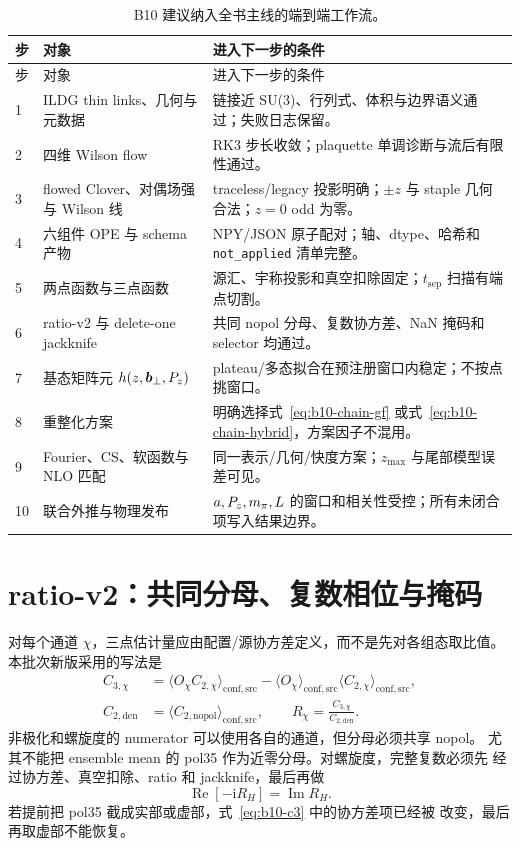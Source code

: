 \begin{longtable}{@{}p{}p{}p{}@{}}
\caption{B10 建议纳入全书主线的端到端工作流。}\label{tab:b10-workflow}\\
\toprule
步 & 对象 & 进入下一步的条件 \\
\midrule
\endfirsthead
\toprule
步 & 对象 & 进入下一步的条件 \\
\midrule
\endhead
1 & ILDG thin links、几何与元数据 & 链接近 SU(3)、行列式、体积与边界语义通过；失败日志保留。\\
2 & 四维 Wilson flow & RK3 步长收敛；plaquette 单调诊断与流后有限性通过。\\
3 & flowed Clover、对偶场强与 Wilson 线 & traceless/legacy 投影明确；$\pm z$ 与 staple 几何合法；$z=0$ odd 为零。\\
4 & 六组件 OPE 与 schema 产物 & NPY/JSON 原子配对；轴、dtype、哈希和 \texttt{not\_applied} 清单完整。\\
5 & 两点函数与三点函数 & 源汇、宇称投影和真空扣除固定；$t_{\mathrm{sep}}$ 扫描有端点切割。\\
6 & ratio-v2 与 delete-one jackknife & 共同 nopol 分母、复数协方差、NaN 掩码和 selector 均通过。\\
7 & 基态矩阵元 $h(z,\boldsymbol b_\perp,P_z)$ & plateau/多态拟合在预注册窗口内稳定；不按点挑窗口。\\
8 & 重整化方案 & 明确选择式~\eqref{eq:b10-chain-gf} 或式~\eqref{eq:b10-chain-hybrid}，方案因子不混用。\\
9 & Fourier、CS、软函数与 NLO 匹配 & 同一表示/几何/快度方案；$z_{\max}$ 与尾部模型误差可见。\\
10 & 联合外推与物理发布 & $a,P_z,m_\pi,L$ 的窗口和相关性受控；所有未闭合项写入结果边界。\\
\bottomrule
\end{longtable}

\section{ratio-v2：共同分母、复数相位与掩码}

对每个通道 $\chi$，三点估计量应由配置/源协方差定义，而不是先对各组态取比值。
本批次新版采用的写法是
\begin{align}
  C_{3,\chi}
  &=\langle O_\chi C_{2,\chi}\rangle_{\mathrm{conf,src}}
  -\langle O_\chi\rangle_{\mathrm{conf,src}}
  \langle C_{2,\chi}\rangle_{\mathrm{conf,src}},
  \label{eq:b10-c3}\\
  C_{2,\mathrm{den}}
  &=\langle C_{2,\mathrm{nopol}}\rangle_{\mathrm{conf,src}},
  \qquad
  R_\chi=\frac{C_{3,\chi}}{C_{2,\mathrm{den}}}.
  \label{eq:b10-ratio}
\end{align}
非极化和螺旋度的 numerator 可以使用各自的通道，但分母必须共享 nopol。
尤其不能把 ensemble mean 的 pol35 作为近零分母。对螺旋度，完整复数必须先
经过协方差、真空扣除、ratio 和 jackknife，最后再做
\begin{equation}
  \operatorname{Re}[-\mathrm{i}R_H]=\operatorname{Im}R_H.
  \label{eq:b10-phase}
\end{equation}
若提前把 pol35 截成实部或虚部，式~\eqref{eq:b10-c3} 中的协方差项已经被
改变，最后再取虚部不能恢复。


